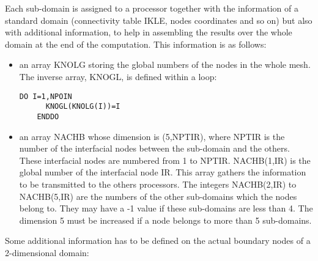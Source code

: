 Each sub-domain is assigned to a processor together with the information of a
standard domain (connectivity table IKLE, nodes coordinates and so on) but also
with additional information, to help in assembling the results over the whole
domain at the end of the computation. This information is as follows:
\begin{itemize}
  \item an array KNOLG storing the global numbers of the nodes in
    the whole mesh. The inverse array, KNOGL, is defined within a loop:
    \begin{lstlisting}[language=TelFortran]
    DO I=1,NPOIN
      KNOGL(KNOLG(I))=I
    ENDDO
    \end{lstlisting}
  \item an array NACHB whose dimension is (5,NPTIR), where NPTIR
    is the number of the interfacial nodes between the sub-domain and the
    others.  These interfacial nodes are numbered from 1 to NPTIR. NACHB(1,IR)
    is the global number of the interfacial node IR. This array gathers the
    information to be transmitted to the others processors. The integers
    NACHB(2,IR) to NACHB(5,IR) are the numbers of the other sub-domains which
    the nodes belong to. They may have a -1 value if these sub-domains are less
    than 4. The dimension 5 must be increased if a node belongs to more than 5
    sub-domains.
\end{itemize}
Some additional information has to be defined on the actual boundary nodes of a
2-dimensional domain:
